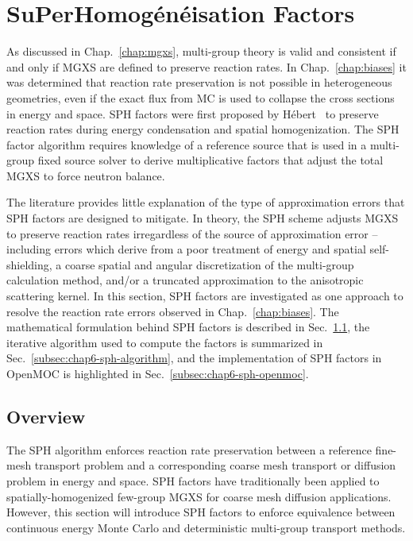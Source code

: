 \section{SuPerHomog\'{e}n\'{e}isation Factors}
\label{sec:chap6-sph}

As discussed in Chap.~\ref{chap:mgxs}, multi-group theory is valid and consistent if and only if \ac{MGXS} are defined to preserve reaction rates. In Chap.~\ref{chap:biases} it was determined that reaction rate preservation is not possible in heterogeneous geometries, even if the exact flux from \ac{MC} is used to collapse the cross sections in energy and space. \ac{SPH} factors were first proposed by H\'{e}bert~\cite{hebert1993consistent} to preserve reaction rates during energy condensation and spatial homogenization. The \ac{SPH} factor algorithm requires knowledge of a reference source that is used in a multi-group fixed source solver to derive multiplicative factors that adjust the total \ac{MGXS} to force neutron balance. 

The literature provides little explanation of the type of approximation errors that \ac{SPH} factors are designed to mitigate. In theory, the \ac{SPH} scheme adjusts \ac{MGXS} to preserve reaction rates irregardless of the source of approximation error -- including errors which derive from a poor treatment of energy and spatial self-shielding, a coarse spatial and angular discretization of the multi-group calculation method, and/or a truncated approximation to the anisotropic scattering kernel. In this section, \ac{SPH} factors are investigated as one approach to resolve the reaction rate errors observed in Chap.~\ref{chap:biases}. The mathematical formulation behind \ac{SPH} factors is described in Sec.~\ref{subsec:chap6-sph-overview}, the iterative algorithm used to compute the factors is summarized in Sec.~\ref{subsec:chap6-sph-algorithm}, and the implementation of \ac{SPH} factors in OpenMOC is highlighted in Sec.~\ref{subsec:chap6-sph-openmoc}.

\subsection{Overview}
\label{subsec:chap6-sph-overview}

The \ac{SPH} algorithm enforces reaction rate preservation between a reference fine-mesh transport problem and a corresponding coarse mesh transport or diffusion problem in energy and space. \ac{SPH} factors have traditionally been applied to spatially-homogenized few-group \ac{MGXS} for coarse mesh diffusion applications. However, this section will introduce \ac{SPH} factors to enforce equivalence between continuous energy Monte Carlo and deterministic multi-group transport methods. 

